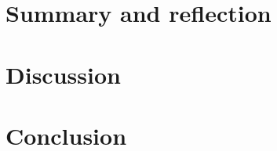 

\section{Summary and reflection}
\label{chapter5-summary-and-reflection}

\section{Discussion}
\label{chapter5-discussion}

\section{Conclusion}
\label{chapter5-conclusion}


